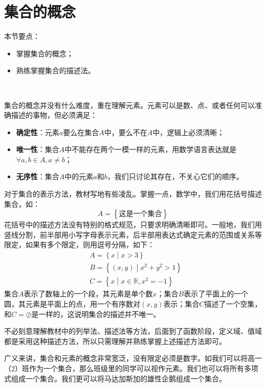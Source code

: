 \section{集合的概念}

本节要点：
\begin{itemize}
    \item 掌握集合的概念；
    \item 熟练掌握集合的描述法。
\end{itemize}

~

集合的概念并没有什么难度，重在理解元素。元素可以是数、点、或者任何可以准确描述的事物，但必须满足：
\begin{itemize}
    \item {\bf 确定性}：元素$a$要么在集合$A$中，要么不在$A$中，逻辑上必须清晰；
    \item {\bf 唯一性}：集合$A$中不能存在两个一模一样的元素，用数学语言表达就是$\forall a,b\in A,a\ne b$；
    \item {\bf 无序性}：集合$A$中的元素$a$和$b$，我们只讨论其存在，不关心它们的顺序。
\end{itemize}

对于集合的表示方法，教材写地有些凌乱。掌握一点，数学中，我们用花括号描述集合，如：
\[
A=\left\{ \text{这是一个集合} \right\}
\]
花括号中的描述方法没有特别的格式规范，只要求明确清晰即可。一般地，我们用竖线分割，前半部用小写字母表示元素，后半部用表达式确定元素的范围或关系等限定，如果有多个限定，则用逗号分隔，如下：
\begin{align*}
&A=\left\{ x \middle| x>3 \right\} \\
&B=\left\{ \left( x,y \right) \middle| x^2+y^2>1 \right\} \\
&C=\left\{ x \middle| x\in \mathbb{R} ,x^2=-1 \right\}
\end{align*}
集合$A$表示了数轴上的一个段，其元素是单个数$x$；集合$B$表示了平面上的一个圆，其元素是平面上的点，用一个有序数对$\left( x,y \right) $表示；集合$C$描述了一个空集，和$C=\oslash $是一样的，这说明集合的描述并不唯一。

\begin{tcolorbox}
不必刻意理解教材中的列举法、描述法等方法，后面到了函数阶段，定义域、值域都是采用这种描述方法，所以只需理解并熟练掌握上述描述方法即可。
\end{tcolorbox}

\begin{tcolorbox}
广义来讲，集合和元素的概念非常宽泛，没有限定必须是数字。如我们可以将高一（2）班作为一个集合，那么班级里的同学可以视作元素。我们也可以将所有多项式组成一个集合。我们更可以将马达加斯加的雄性企鹅组成一个集合。
\end{tcolorbox}




